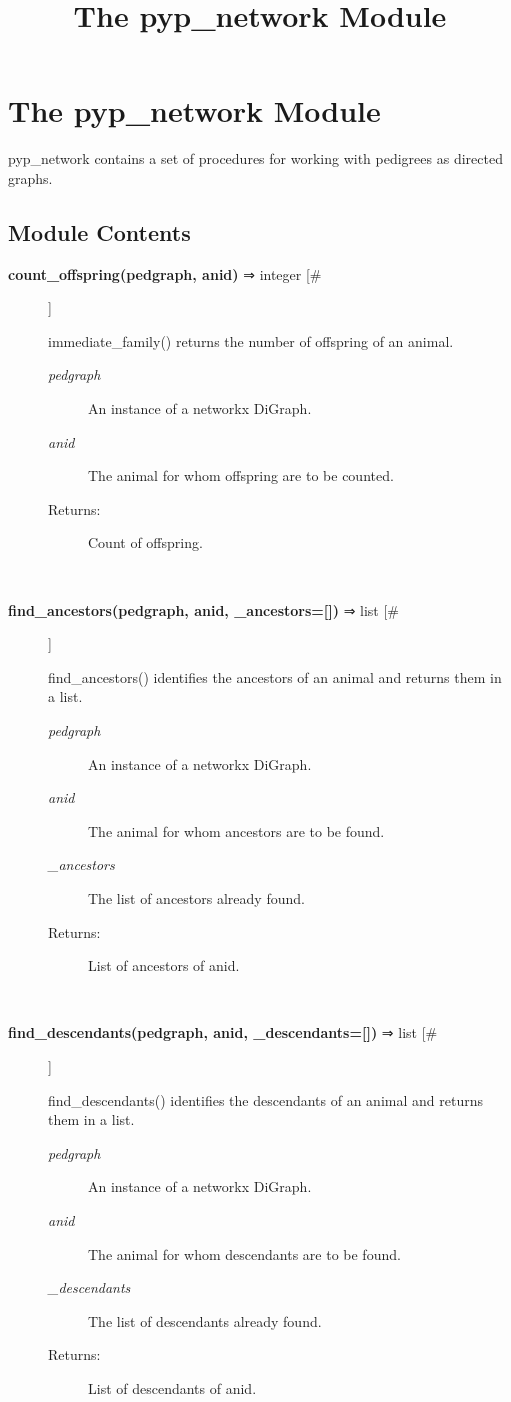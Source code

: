 \documentclass[10pt]{article}
\title{The pyp\_network Module}
\begin{document}
\section*{The pyp\_network Module}


 pyp\_network contains a set of procedures for working with pedigrees as directed graphs.
\subsection*{Module Contents}
\begin{description}
\item[\textbf{count\_offspring(pedgraph, anid)}
 ⇒ integer [\#]]

 immediate\_family() returns the number of offspring of an animal.
\begin{description}
\item[\emph{pedgraph}
] An instance of a networkx DiGraph.
\item[\emph{anid}
] The animal for whom offspring are to be counted.
\item[Returns:] Count of offspring.

\end{description}
\\ 

\item[\textbf{find\_ancestors(pedgraph, anid, \_ancestors=[])}
 ⇒ list [\#]]

 find\_ancestors() identifies the ancestors of an animal and returns them in a list.
\begin{description}
\item[\emph{pedgraph}
] An instance of a networkx DiGraph.
\item[\emph{anid}
] The animal for whom ancestors are to be found.
\item[\emph{\_ancestors}
] The list of ancestors already found.
\item[Returns:] List of ancestors of anid.

\end{description}
\\ 

\item[\textbf{find\_descendants(pedgraph, anid, \_descendants=[])}
 ⇒ list [\#]]

 find\_descendants() identifies the descendants of an animal and returns them in a list.
\begin{description}
\item[\emph{pedgraph}
] An instance of a networkx DiGraph.
\item[\emph{anid}
] The animal for whom descendants are to be found.
\item[\emph{\_descendants}
] The list of descendants already found.
\item[Returns:] List of descendants of anid.


\end{description}
\end{description}
\end{document}
